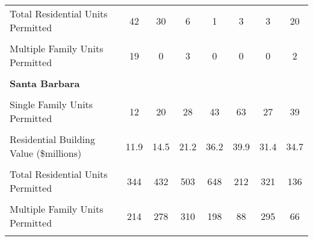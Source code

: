 \begin{table}
\begin{tabular}{lccccccc}
Total Residential Units Permitted & 42 & 30 & 6 & 1 & 3 & 3 & 20\\
\cellcolor{gray!6}{Single Family Units Permitted} & \cellcolor{gray!6}{23} & \cellcolor{gray!6}{30} & \cellcolor{gray!6}{3} & \cellcolor{gray!6}{1} & \cellcolor{gray!6}{3} & \cellcolor{gray!6}{3} & \cellcolor{gray!6}{18}\\
Multiple Family Units Permitted & 19 & 0 & 3 & 0 & 0 & 0 & 2\\
\cellcolor{gray!6}{Residential Building Value (\$millions)} & \cellcolor{gray!6}{6.3} & \cellcolor{gray!6}{6.5} & \cellcolor{gray!6}{0.6} & \cellcolor{gray!6}{1.0} & \cellcolor{gray!6}{1.9} & \cellcolor{gray!6}{2.7} & \cellcolor{gray!6}{0.6}\\
\addlinespace
\textbf{Santa Barbara} & \textbf{} & \textbf{} & \textbf{} & \textbf{} & \textbf{} & \textbf{} & \textbf{}\\
\cellcolor{gray!6}{Total Residential Units Permitted} & \cellcolor{gray!6}{12} & \cellcolor{gray!6}{176} & \cellcolor{gray!6}{224} & \cellcolor{gray!6}{86} & \cellcolor{gray!6}{120} & \cellcolor{gray!6}{29} & \cellcolor{gray!6}{49}\\
Single Family Units Permitted & 12 & 20 & 28 & 43 & 63 & 27 & 39\\
\cellcolor{gray!6}{Multiple Family Units Permitted} & \cellcolor{gray!6}{0} & \cellcolor{gray!6}{156} & \cellcolor{gray!6}{196} & \cellcolor{gray!6}{24} & \cellcolor{gray!6}{57} & \cellcolor{gray!6}{2} & \cellcolor{gray!6}{10}\\
Residential Building Value (\$millions) & 11.9 & 14.5 & 21.2 & 36.2 & 39.9 & 31.4 & 34.7\\
\addlinespace
\textbf{\cellcolor{gray!6}{Santa Maria}} & \textbf{\cellcolor{gray!6}{}} & \textbf{\cellcolor{gray!6}{}} & \textbf{\cellcolor{gray!6}{}} & \textbf{\cellcolor{gray!6}{}} & \textbf{\cellcolor{gray!6}{}} & \textbf{\cellcolor{gray!6}{}} & \textbf{\cellcolor{gray!6}{}}\\
Total Residential Units Permitted & 344 & 432 & 503 & 648 & 212 & 321 & 136\\
\cellcolor{gray!6}{Single Family Units Permitted} & \cellcolor{gray!6}{130} & \cellcolor{gray!6}{154} & \cellcolor{gray!6}{3} & \cellcolor{gray!6}{324} & \cellcolor{gray!6}{124} & \cellcolor{gray!6}{26} & \cellcolor{gray!6}{70}\\
Multiple Family Units Permitted & 214 & 278 & 310 & 198 & 88 & 295 & 66\\
\cellcolor{gray!6}{Residential Building Value (\$millions)} & \cellcolor{gray!6}{52.2} & \cellcolor{gray!6}{41.5} & \cellcolor{gray!6}{50.9} & \cellcolor{gray!6}{4.4} & \cellcolor{gray!6}{2.9} & \cellcolor{gray!6}{3.7} & \cellcolor{gray!6}{6.8}\\

\end{tabular}
\end{table}
